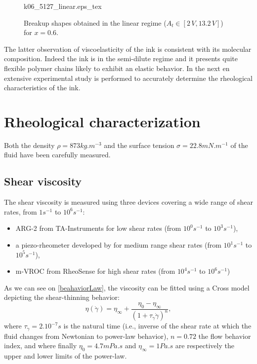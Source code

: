 \documentclass[twocolumn,10pt]{asme2ej}
\begin{document}
\begin{figure}[H] 
    \def\svgwidth{7cm} 
    \vspace{2cm}
    \centering
     {k06_5127_linear.eps_tex}
     \caption{Breakup shapes obtained in the linear regime ($A_t \in [2 \, V,13.2 \, V]$) for $x=0.6$.}
      \label{BUlinear}
  \end{figure}
 
The latter observation of viscoelasticity of the ink is consistent with its molecular composition. Indeed the ink is in the semi-dilute regime and it presents quite flexible polymer chains likely to exhibit an elastic behavior. In the next en extensive experimental study is performed to accurately determine the rheological characteristics of the ink.












\section{Rheological characterization}
Both the density $\rho = 873 kg.m^{-3}$ and the surface tension $\sigma = 22.8 mN.m^{-1}$ of the fluid have been carefully measured.

\subsection{Shear viscosity}
The shear viscosity is measured using three devices covering a wide range of shear rates, from $1s^{-1}$ to $10^6 s^{-1}$:
\begin{itemize}
    \item ARG-2 from TA-Instruments for low shear rates (from $10^0 s^{-1}$ to $10^3 s^{-1}$),
    \item a piezo-rheometer developed by \cite{buchanan2005high} for medium range shear rates (from $10^1 s^{-1}$ to $10^5 s^{-1}$),
    \item m-VROC from RheoSense for high shear rates (from $10^4 s^{-1}$ to $10^6 s^{-1}$)
\end{itemize}
As we can see on \ref{beahaviorLaw}, the viscosity can be fitted using a Cross model depicting the shear-thinning behavior:
\begin{equation}
    \eta(\dot{\gamma})=\eta_{\infty} + \frac{\eta_0 - \eta_{\infty}}{(1+\tau_{\dot{\gamma}} \dot{\gamma})^{n}},
    \label{crossEq}
  \end{equation}
where $\tau_{\dot{\gamma}}=2.10^{-7}s$ is the natural time (i.e., inverse of the shear rate at which the fluid changes from Newtonian to power-law behavior), $n=0.72$ the flow behavior index, and where finally $\eta_0=4.7 mPa.s $ and $\eta_\infty = 1 Pa.s$ are respectively the upper and lower limits of the power-law.
\end{document}
